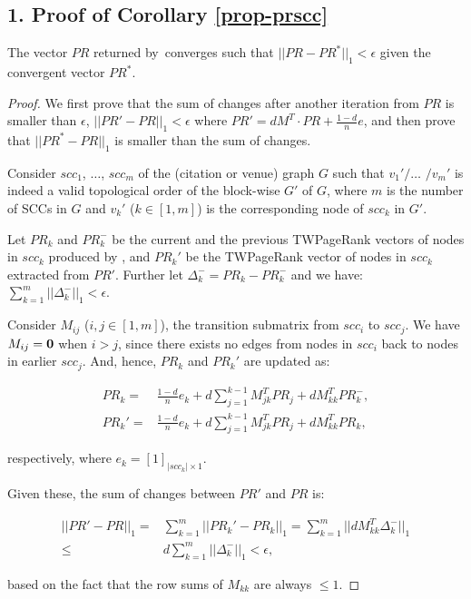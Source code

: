 \subsection*{1. Proof of Corollary \ref{prop-prscc}}
The vector $PR$ returned by~\twprscc converges such that $||PR-PR^*||_1 < \epsilon$ given the convergent vector $PR^*$.

\begin{proof}
We first prove that the sum of changes after another iteration from $PR$ is smaller than $\epsilon$, \ie $||PR'-PR||_1 < \epsilon$ where $PR'=d M^T\cdot PR + \frac{1-d}{n} e$, and then prove that $||PR^*-PR||_1$ is smaller than the sum of changes.

Consider $scc_1$, $\dots$, $scc_m$ of the (citation or venue) graph $G$ such that $v_1'/\dots$ $/v_m'$ is indeed a valid topological order of the block-wise $G'$ of $G$, where $m$ is the number of SCCs in $G$ and $v_k'$ ($k\in [1,m]$) is the corresponding node of $scc_k$ in $G'$.

Let $PR_k$ and $PR_k^-$ be the current and the previous TWPageRank vectors of nodes in $scc_k$ produced
by \twprscc, and $PR_k'$ be the TWPageRank vector of nodes in $scc_k$ extracted from $PR'$.
Further let $\Delta_k^-=PR_k-PR_k^-$ and we have:
$\sum_{k=1}^m ||\Delta_k^-||_1 < \epsilon$.

Consider $M_{ij}$ ($i,j\in[1,m]$), the transition submatrix from $scc_i$ to $scc_j$. We have $M_{ij}=\bf{0}$ when $i>j$, since there exists no edges from nodes in $scc_i$ back to nodes in earlier $scc_j$. And, hence, $PR_k$ and $PR_k'$ are updated as:
%
\begin{small}
\begin{equation*}
\begin{split}
PR_k=&\frac{1-d}{n} e_k+ d \sum_{j=1}^{k-1} M_{jk}^T PR_j + d M_{kk}^T PR_k^-,\\
PR_k'=&\frac{1-d}{n}  e_k+ d \sum_{j=1}^{k-1} M_{jk}^T PR_j + d M_{kk}^T PR_k,
\end{split}
\end{equation*}
\end{small}
\noindent
respectively, where $e_k=[1]_{|scc_k|\times 1}$.

\vspace{1ex}
Given these, the sum of changes between $PR'$ and $PR$ is:
%
\begin{small}
\begin{equation*}
\begin{split}
||PR'-PR||_1=&\sum_{k=1}^m ||PR_k'-PR_k||_1=\sum_{k=1}^m ||d M_{kk}^T \Delta_k^-||_1 \\
\le & d\sum_{k=1}^m ||\Delta_k^-||_1 < \epsilon,
\end{split}
\end{equation*}
\end{small}
\noindent
based on the fact that the row sums of $M_{kk}$ are always $\le 1$. %


\end{proof}
